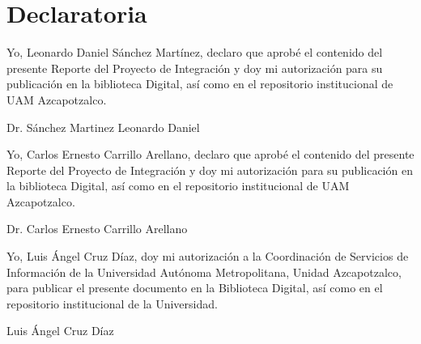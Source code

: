 \thispagestyle{empty}
\section*{\centering Declaratoria}

\noindent Yo, Leonardo Daniel Sánchez Martínez, declaro que aprobé el contenido del presente Reporte del Proyecto de Integración y doy mi autorización para su publicación en la biblioteca Digital, así como en el repositorio institucional de UAM Azcapotzalco.\\[3cm]

\begin{center}
    Dr. Sánchez Martinez Leonardo Daniel \\[1.5cm]
\end{center}

\noindent Yo, Carlos Ernesto Carrillo Arellano, declaro que aprobé el contenido del presente Reporte del Proyecto de Integración y doy mi autorización para su publicación en la biblioteca Digital, así como en el repositorio institucional de UAM Azcapotzalco.\\[3cm]

\begin{center}
    Dr. Carlos Ernesto Carrillo Arellano \\[1.5cm]
\end{center}

\noindent Yo, Luis Ángel Cruz Díaz, doy mi autorización a la Coordinación de Servicios de Información de la Universidad Autónoma Metropolitana, Unidad Azcapotzalco, para publicar el presente documento en la Biblioteca Digital, así como en el repositorio institucional de la Universidad.\\[3cm]

\begin{center}
    Luis Ángel Cruz Díaz \\[1.5cm]
\end{center}

\vfill
\newpage
